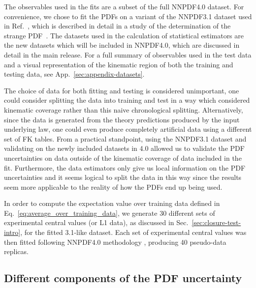 The observables used in the fits are a subset of the full NNPDF4.0 dataset. For
convenience, we chose to fit the PDFs on a variant of the NNPDF3.1 dataset used
in Ref.~\cite{Ball_2018}, which is described in detail in a study of the
determination of the strange PDF~\cite{Faura_2020}. The datasets used in the
calculation of statistical estimators are the new datasets which will be
included in NNPDF4.0, which are discussed in detail in the main release. For a
full summary of observables used in the test data and a visual representation of
the kinematic region of both the training and testing data, see
App.~\ref{sec:appendix-datasets}.

The choice of data for both fitting and testing is considered unimportant, one
could consider splitting the data into training and test in a way which
considered kinematic coverage rather than this naive chronological splitting.
Alternatively, since the data is generated from the theory predictions produced
by the input underlying law, one could even produce completely artificial data
using a different set of FK tables. From a practical standpoint, using the
NNPDF3.1 dataset and validating on the newly included datasets in 4.0 allowed us
to validate the PDF uncertainties on data outside of the kinematic coverage of
data included in the fit. Furthermore, the data estimators only give us local
information on the PDF uncertainties and it seems logical to split the data in
this way since the results seem more applicable to the reality of how the PDFs
end up being used.

In order to compute the expectation value over training data defined in
Eq.~\ref{eq:average_over_training_data}, we generate 30 different sets of
experimental central values (or L1 data), as discussed in
Sec.~\ref{sec:closure-test-intro}, for the fitted 3.1-like dataset. Each set of
experimental central values was then fitted following NNPDF4.0 methodology
\cite{NNPDF40}, producing 40 pseudo-data replicas.


\subsection{Different components of the PDF uncertainty}

